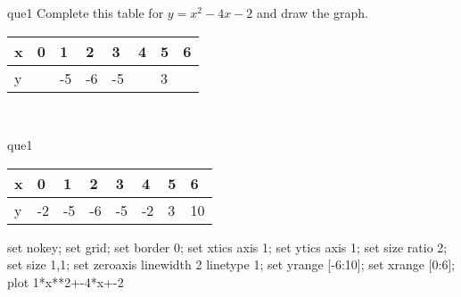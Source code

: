 \documentclass[13.5pt, varwidth=true]{beamer}
\begin{document}
\begin{frame}[shrink=19,fragile]
	\begin{beamercolorbox}[rounded=true, left, shadow=true,wd=14.8cm]{que1}
		 Complete this table for $y = x^{2} - 4x - 2$ and draw the graph. \\[0.3cm] \renewcommand{\arraystretch}{1.2}\begin{tabular}{|C|C|C|C|C|C|C|C|} \hline x & 0 & 1 & 2 & 3 & 4 & 5 & 6 \\ \hline y &  & -5 & -6 & -5 &  & 3 & \\ \hline \end{tabular}\\[0.3cm]
	\end{beamercolorbox}
\end{frame}
\begin{frame}[shrink=19,fragile]
	\begin{beamercolorbox}[rounded=true, left, shadow=true,wd=14.8cm]{que1}
		\renewcommand{\arraystretch}{1.2}\begin{tabular}{|C|C|C|C|C|C|C|C|} \hline x & 0 & 1 & 2 & 3 & 4 & 5 & 6 \\ \hline y & -2 & -5 & -6 & -5 & -2 & 3 & 10\\ \hline \end{tabular}\begin{gnuplot}[terminal=pdf] set nokey; set grid; set border 0; set xtics axis 1; set ytics axis 1; set size ratio 2; set size 1,1; set zeroaxis linewidth 2 linetype 1; set yrange [-6:10]; set xrange [0:6]; plot 1*x**2+-4*x+-2 \end{gnuplot}
	\end{beamercolorbox}
\end{frame}
\end{document}
